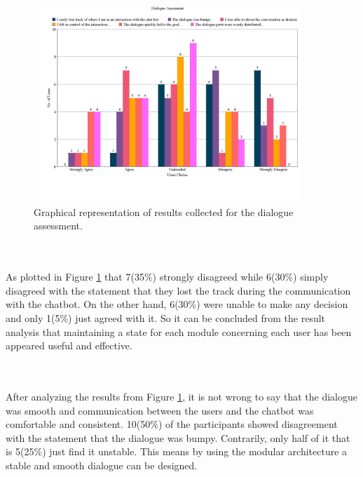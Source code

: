\begin{figure}[!h]
    \centering
    \includegraphics[width=0.9\textwidth]{img/Dialogue_Assessment_Updated.png}
    \caption{Graphical representation of results collected for the dialogue assessment.}
    \label{fig:dialogAssess}
\end{figure}
\\~\\
As plotted in Figure \ref{fig:dialogAssess} that 7(35\%) strongly disagreed while 6(30\%) simply disagreed with the statement that they lost the track during the communication with the chatbot. On the other hand, 6(30\%) were unable to make any decision and only 1(5\%) just agreed with it. So it can be concluded from the result analysis that maintaining a state for each module concerning each user has been appeared useful and effective.

\\~\\
After analyzing the results from Figure \ref{fig:dialogAssess}, it is not wrong to say that the dialogue was smooth and communication between the users and the chatbot was comfortable and consistent. 10(50\%) of the participants showed disagreement with the statement that the dialogue was bumpy. Contrarily, only half of it that is 5(25\%) just find it unstable. This means by using the modular architecture a stable and smooth dialogue can be designed.

